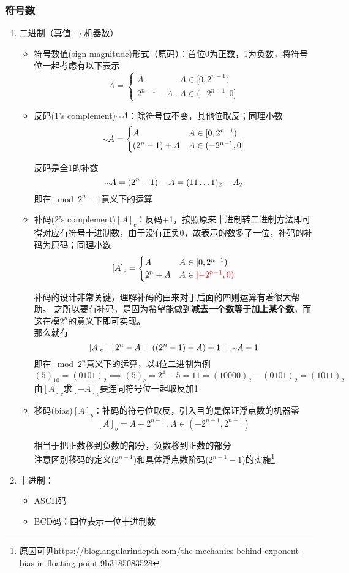 \subsubsection{符号数}
\begin{enumerate}
\item 二进制（真值$\to$机器数）
\begin{itemize}
	\item 符号数值(sign-magnitude)形式（原码）：首位0为正数，1为负数，将符号位一起考虑有以下表示
	\[A=\begin{cases}
	A & A\in[0,2^{n-1})\\
	2^{n-1}-A & A\in(-2^{n-1},0]
	\end{cases}\]
	\item 反码(1's complement)${\scriptstyle{\sim}} A$：除符号位不变，其他位取反；同理小数
	\[{\scriptstyle{\sim}} A=\begin{cases}
	A & A\in[0,2^{n-1})\\
	(2^n-1)+A & A\in (-2^{n-1},0]
	\end{cases}\]
	\begin{analysis}
	反码是全1的补数
	\[{\scriptstyle{\sim}} A=(2^n-1)-A=(11\ldots 1)_2-A_2\]
	即在$\mod 2^{n}-1$意义下的运算
	\end{analysis}
	\item 补码(2's complement)$[A]_c$：反码+1，按照原来十进制转二进制方法即可得对应有符号十进制数，由于没有正负0，故表示的数多了一位，补码的补码为原码；同理小数
	\[[A]_c=\begin{cases}
	A & A\in[0,2^{n-1})\\
	2^n+A & A\in \textcolor{red}{[-2^{n-1},0)}
	\end{cases}\]
	\begin{analysis}
	补码的设计非常关键，理解补码的由来对于后面的四则运算有着很大帮助。
	之所以要有补码，是因为希望能做到\textbf{减去一个数等于加上某个数}，而这在模$2^n$的意义下即可实现。\\
	那么就有
	\[[A]_c=2^n-A=((2^n-1)-A)+1={\scriptstyle{\sim}} A+1\]
	即在$\mod 2^n$意义下的运算，以4位二进制为例
	\[(5)_{10}=(0101)_2\implies (5)_c=2^4-5=11=(10000)_2-(0101)_2=(1011)_2\]
	由$[A]_c$求$[-A]_c$要连同符号位一起取反加1
	\end{analysis}
	\item 移码(bias)$[A]_b$：补码的符号位取反，引入目的是保证浮点数的机器零
	\[[A]_b=A+2^{n-1}\,,A\in(-2^{n-1},2^{n-1})\]
	\begin{analysis}
	相当于把正数移到负数的部分，负数移到正数的部分\\
	注意区别移码的定义($2^{n-1}$)和具体浮点数阶码($2^{n-1}-1$)的实施\footnote{原因可见\url{https://blog.angularindepth.com/the-mechanics-behind-exponent-bias-in-floating-point-9b3185083528}}
	\end{analysis}
\end{itemize}
\item 十进制：
\begin{itemize}
	\item ASCII码
	\item BCD码：四位表示一位十进制数
\end{itemize}
\end{enumerate}

